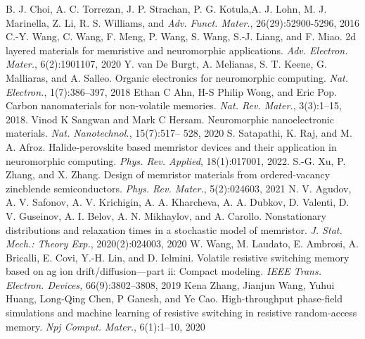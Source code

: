 \documentclass[10pt]{article}
\begin{document}
    \begin{multicols}{2}
        \begin{thebibliography}{13}
            B. J. Choi, A. C. Torrezan, J. P. Strachan, P. G. Kotula,A. J. Lohn, M. J. Marinella, Z. Li, R. S. Williams, and \textit{Adv. Funct. Mater.}, 26(29):52900-5296, 2016
             C.-Y. Wang, C. Wang, F. Meng, P. Wang, S. Wang, S.-J. Liang, and F. Miao. 2d layered materials for memristive and neuromorphic applications. \textit{Adv. Electron. Mater.}, 6(2):1901107, 2020
             Y. van De Burgt, A. Melianas, S. T. Keene, G. Malliaras, and A. Salleo. Organic electronics for neuromorphic computing. \textit{Nat. Electron.}, 1(7):386–397, 2018
             Ethan C Ahn, H-S Philip Wong, and Eric Pop. Carbon nanomaterials for non-volatile memories. \textit{Nat. Rev. Mater.}, 3(3):1–15, 2018.
             Vinod K Sangwan and Mark C Hersam. Neuromorphic nanoelectronic materials. \textit{Nat. Nanotechnol.}, 15(7):517– 528, 2020
             S. Satapathi, K. Raj, and M. A. Afroz. Halide-perovskite based memristor devices and their application in neuromorphic computing. \textit{Phys. Rev. Applied}, 18(1):017001, 2022.
             S.-G. Xu, P. Zhang, and X. Zhang. Design of memristor materials from ordered-vacancy zincblende semiconductors. \textit{Phys. Rev. Mater.}, 5(2):024603, 2021
             N. V. Agudov, A. V. Safonov, A. V. Krichigin, A. A. Kharcheva, A. A. Dubkov, D. Valenti, D. V. Guseinov, A. I. Belov, A. N. Mikhaylov, and A. Carollo. Nonstationary distributions and relaxation times in a stochastic model of memristor. \textit{J. Stat. Mech.: Theory Exp.}, 2020(2):024003, 2020
             W. Wang, M. Laudato, E. Ambrosi, A. Bricalli, E. Covi, Y.-H. Lin, and D. Ielmini. Volatile resistive switching memory based on ag ion drift/diffusion—part ii: Compact modeling. \textit{IEEE Trans. Electron. Devices,} 66(9):3802–3808, 2019
             Kena Zhang, Jianjun Wang, Yuhui Huang, Long-Qing Chen, P Ganesh, and Ye Cao. High-throughput phase-field simulations and machine learning of resistive switching in resistive random-access memory. \textit{Npj Comput. Mater.}, 6(1):1–10, 2020
        \end{thebibliography}
    \end{multicols}
\end{document}
